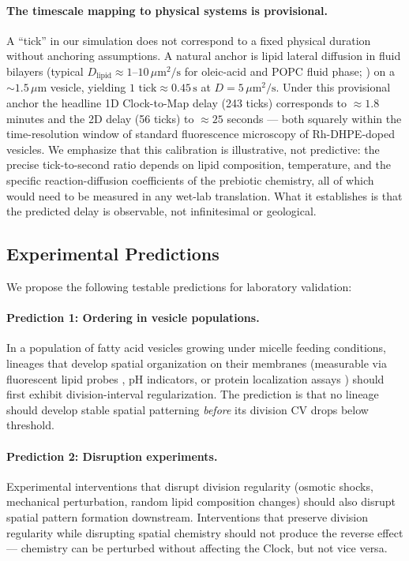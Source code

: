 \documentclass[11pt,letterpaper]{article}
\begin{document}
\paragraph{The timescale mapping to physical systems is provisional.} A ``tick'' in our simulation does not correspond to a fixed physical duration without anchoring assumptions. A natural anchor is lipid lateral diffusion in fluid bilayers (typical $D_{\mathrm{lipid}} \approx 1$--$10\,\mu\mathrm{m}^2/\mathrm{s}$ for oleic-acid and POPC fluid phase; \citealt{vaz1984lateral,machan2010lipid}) on a $\sim 1.5\,\mu\mathrm{m}$ vesicle, yielding $1\text{ tick} \approx 0.45\,\mathrm{s}$ at $D = 5\,\mu\mathrm{m}^2/\mathrm{s}$. Under this provisional anchor the headline 1D Clock-to-Map delay (243 ticks) corresponds to $\approx 1.8$ minutes and the 2D delay (56 ticks) to $\approx 25$ seconds --- both squarely within the time-resolution window of standard fluorescence microscopy of Rh-DHPE-doped vesicles. We emphasize that this calibration is illustrative, not predictive: the precise tick-to-second ratio depends on lipid composition, temperature, and the specific reaction-diffusion coefficients of the prebiotic chemistry, all of which would need to be measured in any wet-lab translation. What it establishes is that the predicted delay is observable, not infinitesimal or geological.

\subsection{Experimental Predictions}

We propose the following testable predictions for laboratory validation:

\paragraph{Prediction 1: Ordering in vesicle populations.} In a population of fatty acid vesicles growing under micelle feeding conditions, lineages that develop spatial organization on their membranes (measurable via fluorescent lipid probes \citep{dealmeida2003sphingomyelin}, pH indicators, or protein localization assays \citep{kurihara2011self}) should first exhibit division-interval regularization. The prediction is that no lineage should develop stable spatial patterning \emph{before} its division CV drops below threshold.

\paragraph{Prediction 2: Disruption experiments.} Experimental interventions that disrupt division regularity (osmotic shocks, mechanical perturbation, random lipid composition changes) should also disrupt spatial pattern formation downstream. Interventions that preserve division regularity while disrupting spatial chemistry should not produce the reverse effect --- chemistry can be perturbed without affecting the Clock, but not vice versa.
\end{document}
